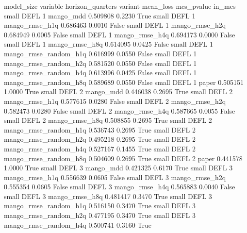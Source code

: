 model_size variable  horizon_quarters               variant  mean_loss  mcs_pvalue  in_mcs
     small     DEFL                 1             mango_mdd   0.509808      0.2230    True
     small     DEFL                 1        mango_rmse_h1q   0.686463      0.0010   False
     small     DEFL                 1        mango_rmse_h2q   0.684949      0.0005   False
     small     DEFL                 1        mango_rmse_h4q   0.694173      0.0000   False
     small     DEFL                 1        mango_rmse_h8q   0.614095      0.0425   False
     small     DEFL                 1 mango_rmse_random_h1q   0.616999      0.0550   False
     small     DEFL                 1 mango_rmse_random_h2q   0.581520      0.0550   False
     small     DEFL                 1 mango_rmse_random_h4q   0.613996      0.0425   False
     small     DEFL                 1 mango_rmse_random_h8q   0.589689      0.0550   False
     small     DEFL                 1                 paper   0.505151      1.0000    True
     small     DEFL                 2             mango_mdd   0.446038      0.2695    True
     small     DEFL                 2        mango_rmse_h1q   0.577615      0.0280   False
     small     DEFL                 2        mango_rmse_h2q   0.582473      0.0280   False
     small     DEFL                 2        mango_rmse_h4q   0.587665      0.0055   False
     small     DEFL                 2        mango_rmse_h8q   0.508855      0.2695    True
     small     DEFL                 2 mango_rmse_random_h1q   0.536743      0.2695    True
     small     DEFL                 2 mango_rmse_random_h2q   0.495218      0.2695    True
     small     DEFL                 2 mango_rmse_random_h4q   0.527167      0.1455    True
     small     DEFL                 2 mango_rmse_random_h8q   0.504609      0.2695    True
     small     DEFL                 2                 paper   0.441578      1.0000    True
     small     DEFL                 3             mango_mdd   0.421325      0.6170    True
     small     DEFL                 3        mango_rmse_h1q   0.556639      0.0605   False
     small     DEFL                 3        mango_rmse_h2q   0.555354      0.0605   False
     small     DEFL                 3        mango_rmse_h4q   0.565883      0.0040   False
     small     DEFL                 3        mango_rmse_h8q   0.481417      0.3470    True
     small     DEFL                 3 mango_rmse_random_h1q   0.516150      0.3470    True
     small     DEFL                 3 mango_rmse_random_h2q   0.477195      0.3470    True
     small     DEFL                 3 mango_rmse_random_h4q   0.500741      0.3160    True
